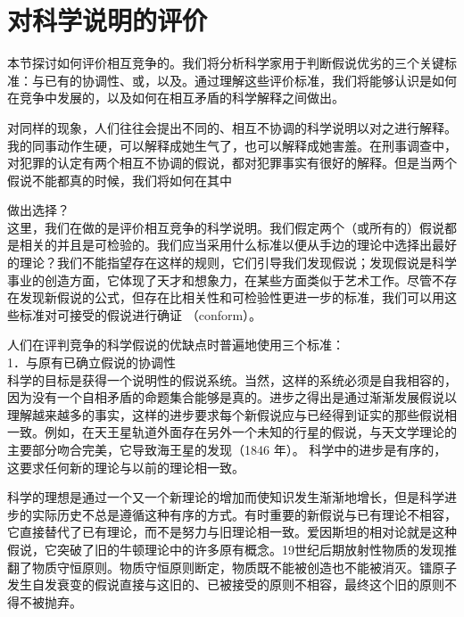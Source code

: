 \section{对科学说明的评价}

\begin{logicbox}[title=引言]
本节探讨如何评价相互竞争的。我们将分析科学家用于判断假说优劣的三个关键标准：与已有的协调性、或，以及。通过理解这些评价标准，我们将能够认识是如何在竞争中发展的，以及如何在相互矛盾的科学解释之间做出。
\end{logicbox}

对同样的现象，人们往往会提出不同的、相互不协调的科学说明以对之进行解释。我的同事动作生硬，可以解释成她生气了，也可以解释成她害羞。在刑事调查中，对犯罪的认定有两个相互不协调的假说，都对犯罪事实有很好的解释。但是当两个假说不能都真的时候，我们将如何在其中

做出选择？\\
这里，我们在做的是评价相互竞争的科学说明。我们假定两个（或所有的）假说都是相关的并且是可检验的。我们应当采用什么标准以便从手边的理论中选择出最好的理论？我们不能指望存在这样的规则，它们引导我们发现假说；发现假说是科学事业的创造方面，它体现了天才和想象力，在某些方面类似于艺术工作。尽管不存在发现新假说的公式，但存在比相关性和可检验性更进一步的标准，我们可以用这些标准对可接受的假说进行确证 （conform）。

人们在评判竞争的科学假说的优缺点时普遍地使用三个标准：\\
1．与原有已确立假说的协调性\\
科学的目标是获得一个说明性的假说系统。当然，这样的系统必须是自我相容的，因为没有一个自相矛盾的命题集合能够是真的。进步之得出是通过渐渐发展假说以理解越来越多的事实，这样的进步要求每个新假说应与已经得到证实的那些假说相一致。例如，在天王星轨道外面存在另外一个未知的行星的假说，与天文学理论的主要部分吻合完美，它导致海王星的发现（1846 年）。\cite{kuhn1957} 科学中的进步是有序的，这要求任何新的理论与以前的理论相一致。

科学的理想是通过一个又一个新理论的增加而使知识发生渐渐地增长，但是科学进步的实际历史不总是遵循这种有序的方式。有时重要的新假说与已有理论不相容，它直接替代了已有理论，而不是努力与旧理论相一致。爱因斯坦的相对论就是这种假说，它突破了旧的牛顿理论中的许多原有概念。19世纪后期放射性物质的发现推翻了物质守恒原则。物质守恒原则断定，物质既不能被创造也不能被消灭。镭原子发生自发衰变的假说直接与这旧的、已被接受的原则不相容，最终这个旧的原则不得不被抛弃。

